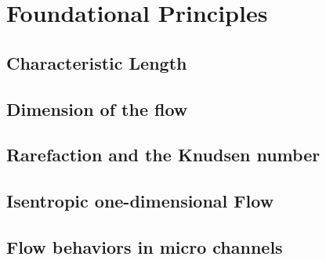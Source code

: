 \section{Foundational Principles}

\subsection{Characteristic Length}  

\newpage

\subsection{Dimension of the flow}

\newpage

\subsection{Rarefaction and the Knudsen number}

\newpage

\subsection{Isentropic one-dimensional Flow}

\newpage

\subsection{Flow behaviors in micro channels}

\newpage

